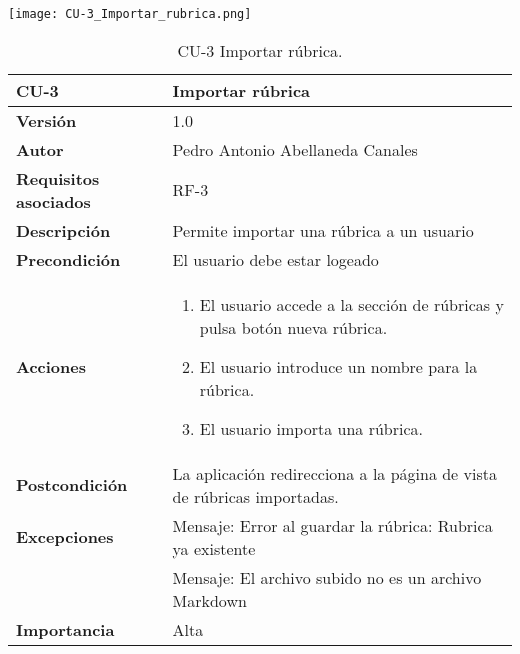 \begin{table}[p]
	\centering
	\texttt{[image: CU-3\_Importar\_rubrica.png]} %
	\begin{tabularx}{\linewidth}{ p{} p{} }
		\toprule
		\textbf{CU-3}    & \textbf{Importar rúbrica} \\
		\midrule
		\textbf{Versión}              & 1.0    \\
		\textbf{Autor}                & Pedro Antonio Abellaneda Canales \\
		\textbf{Requisitos asociados} & RF-3 \\
		\textbf{Descripción}          & Permite importar una rúbrica a un usuario \\
		\textbf{Precondición}         & El usuario debe estar logeado \\
		\textbf{Acciones}             &
		\begin{enumerate}
			\def\labelenumi{\arabic{enumi}.}
			\tightlist
			\item El usuario accede a la sección de rúbricas y pulsa botón nueva rúbrica.
			\item El usuario introduce un nombre para la rúbrica.
			\item El usuario importa una rúbrica.
		\end{enumerate} \\
		\textbf{Postcondición}        & La aplicación redirecciona a la página de vista de rúbricas importadas. \\ 
		\textbf{Excepciones}          & Mensaje: Error al guardar la rúbrica: Rubrica ya existente\\ 
		                              & Mensaje: El archivo subido no es un archivo Markdown \\ 
		\textbf{Importancia}          & Alta \\
		\bottomrule
	\end{tabularx}
	\caption{CU-3 Importar rúbrica.}
	\label{tab:CU-3}
\end{table}

